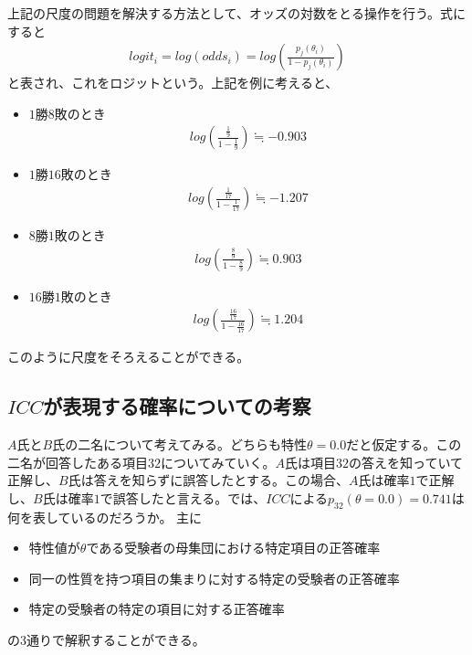 \documentclass[12pt]{jarticle}
\begin{document}
上記の尺度の問題を解決する方法として、オッズの対数をとる操作を行う。式にすると
\begin{eqnarray}
  \label{07}
  \displaystyle logit_i = log(odds_i) = log(\frac{p_j(\theta_i)}{1 - p_j(\theta_i)})
\end{eqnarray}
と表され、これをロジットという。上記を例に考えると、
  \begin{itemize}
  \item $1$勝$8$敗のとき
  \begin{eqnarray}
    \label{08}
    \displaystyle log \left(\frac{\frac{1}{9}}{1 - \frac{1}{9}}\right) \fallingdotseq -0.903
  \end{eqnarray}
  \item $1$勝$16$敗のとき
  \begin{eqnarray}
    \label{09}
    \displaystyle log \left(\frac{\frac{1}{17}}{1 - \frac{1}{17}}\right) \fallingdotseq -1.207
  \end{eqnarray}
  \item $8$勝$1$敗のとき
  \begin{eqnarray}
    \label{10}
    \displaystyle log \left(\frac{\frac{8}{9}}{1 - \frac{8}{9}}\right) \fallingdotseq 0.903
  \end{eqnarray}
  \item $16$勝$1$敗のとき
  \begin{eqnarray}
    \label{11}
    \displaystyle log \left(\frac{\frac{16}{17}}{1 - \frac{16}{17}}\right) \fallingdotseq 1.204
  \end{eqnarray}
\end{itemize}
このように尺度をそろえることができる。
\subsection{$ICC$が表現する確率についての考察}
$A$氏と$B$氏の二名について考えてみる。どちらも特性$\theta = 0.0$だと仮定する。この二名が回答したある項目$32$についてみていく。$A$氏は項目$32$の答えを知っていて正解し、$B$氏は答えを知らずに誤答したとする。この場合、$A$氏は確率$1$で正解し、$B$氏は確率$1$で誤答したと言える。では、$ICC$による$p_{32}(\theta = 0.0) = 0.741$は何を表しているのだろうか。
主に
\begin{itemize}
  \item 特性値が$\theta$である受験者の母集団における特定項目の正答確率
  \item 同一の性質を持つ項目の集まりに対する特定の受験者の正答確率
  \item 特定の受験者の特定の項目に対する正答確率
\end{itemize}
の$3$通りで解釈することができる。
\end{document}
